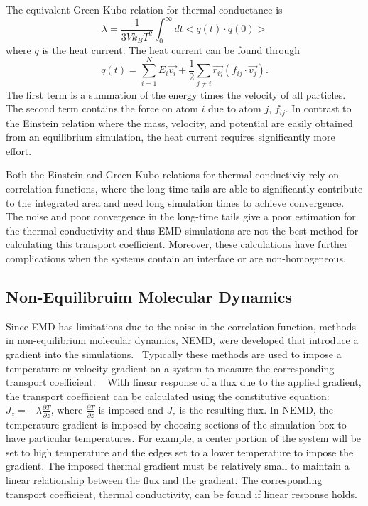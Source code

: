 The equivalent Green-Kubo relation for thermal conductance is
\begin{equation}
    \lambda = \frac{1}{3Vk_BT^2}\int^\infty_0 dt <q(t) \cdot q(0)>
\end{equation}
where $q$ is the heat current.
The heat current can be found through
\begin{equation}
    q(t) = \sum^N_{i=1} E_i \vec{v_i} + \frac{1}{2}\sum_{j \neq i} \vec{r_{ij}} (f_{ij} \cdot \vec{v_j}).
\end{equation}
The first term is a summation of the energy times the velocity of all particles. The second term contains the force on atom $i$ due to atom $j$, $f_{ij}$.
In contrast to the Einstein relation where the mass, velocity, and potential are easily obtained from an equilibrium simulation, the heat current requires significantly more effort.

Both the Einstein and Green-Kubo relations for thermal conductiviy rely on correlation functions, where the long-time tails are able to significantly contribute to the integrated area and need long simulation times to achieve convergence.
The noise and poor convergence in the long-time tails give a poor estimation for the thermal conductivity and thus EMD simulations are not the best method for calculating this transport coefficient.
Moreover, these calculations have further complications when the systems contain an interface or are non-homogeneous.

\subsection{Non-Equilibruim Molecular Dynamics}
Since EMD has limitations due to the noise in the correlation function, methods in non-equilibrium molecular dynamics, NEMD, were developed that introduce a gradient into the simulations.~\cite{Backer:2005sf,Hess:2002nr,Picalek:2009rz, Vasquez:2004ty}
Typically these methods are used to impose a temperature or velocity gradient on a system to measure the corresponding transport coefficient. ~\cite{Evans:1982oq, Erpenbeck:1984qe, Evans:1986nx, Vogelsang:1988qv, Maginn:1993kl, Hess:2002nr, Schelling:2002dp, Berthier:2002ai, Evans:2002tg, Vasquez:2004ty, Backer:2005sf, Jiang:2008hc, Picalek:2009rz}
With linear response of a flux due to the applied gradient, the transport coefficient can be calculated using the constitutive equation: $J_z = -\lambda \frac{\partial T}{\partial z}$, where $\frac{\partial T}{\partial z}$ is imposed and $J_z$ is the resulting flux.
In NEMD, the temperature gradient is imposed by choosing sections of the simulation box to have particular temperatures. For example, a center portion of the system will be set to high temperature and the edges set to a lower temperature to impose the gradient. 
The imposed thermal gradient must be relatively small to maintain a linear relationship between the flux and the gradient. 
The corresponding transport coefficient, thermal conductivity, can be found if linear response holds.

